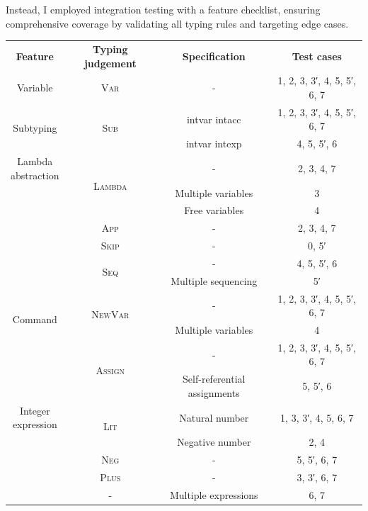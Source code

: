 \documentclass[12pt,a4paper]{report}
\theoremstyle{definition}
\begin{document}
    Instead, I employed integration testing with a feature checklist, ensuring comprehensive coverage by validating all typing rules and targeting edge cases.
    \begin{table}[H]
        \centering
        \begin{tabular}{| c | c | c | c |}
            \hline
            \textbf{Feature}  & \textbf{Typing judgement} & \textbf{Specification} & \textbf{Test cases} \\
            \hhline{|=|=|=|=|}
            Variable & \textsc{Var} & - & 1, 2, 3, 3′, 4, 5, 5′, 6, 7 \\ \cline{3-4}
            \hline
            \multirow{2}{*}{Subtyping} 
                & \multirow{2}{*}{\textsc{Sub}} 
                    & \textsf{intvar} \text{\leq:} \textsf{intacc} & 1, 2, 3, 3′, 4, 5, 5′, 6, 7  \\ \cline{3-4}
                &   & \textsf{intvar} \text{\leq:} \textsf{intexp} & 4, 5, 5′, 6 \\
            \hline
            \multirowcell{4}{Lambda\\abstraction} 
                & \multirow{3}{*}{\textsc{Lambda}} 
                    & - & 2, 3, 4, 7 \\ \cline{3-4}
                &   & Multiple variables & 3  \\ \cline{3-4}
                &   & Free variables & 4 \\ \cline{2-4}
                & \textsc{App} & - & 2, 3, 4, 7  \\
            \hline
            \multirow{7}{*}{Command} 
                & \textsc{Skip} & - & 0, 5′ \\ \cline{2-4}
                & \multirow{2}{*}{\textsc{Seq}} 
                    & - & 4, 5, 5′, 6 \\ \cline{3-4}
                &   & Multiple sequencing & 5′ \\ \cline{2-4}
                & \multirow{2}{*}{\textsc{NewVar}} 
                    & - & 1, 2, 3, 3′, 4, 5, 5′, 6, 7 \\ \cline{3-4}
                &   & Multiple variables & 4 \\ \cline{2-4}
                & \multirow{2}{*}{\textsc{Assign}} 
                    & -  & 1, 2, 3, 3′, 4, 5, 5′, 6, 7  \\ \cline{3-4}
                &   & Self-referential assignments & 5, 5′, 6 \\
            \hline
            \multirowcell{5}{Integer\\expression} 
                & \multirow{2}{*}{\textsc{Lit}}  
                    & Natural number  & 1, 3, 3′, 4, 5, 6, 7 \\ \cline{3-4}
                &   & Negative number & 2, 4 \\ \cline{2-4}
                & \textsc{Neg} & - & 5, 5′, 6, 7  \\ \cline{2-4}
                & \textsc{Plus} & - & 3, 3′, 6, 7  \\ \cline{2-4}
                & -             & Multiple expressions & 6, 7 \\
            \hline
        \end{tabular}


\end{table}
\end{document}
